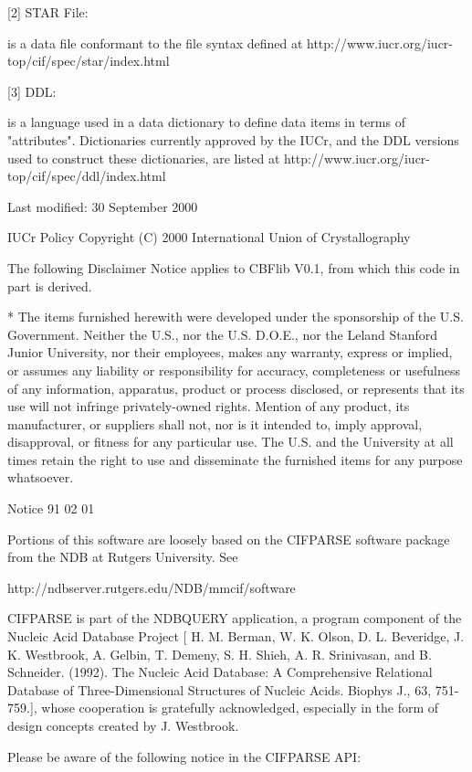 [2] STAR File:

is a data file conformant to the file syntax defined at
http://www.iucr.org/iucr-top/cif/spec/star/index.html

[3] DDL:

is a language used in a data dictionary to define data items in terms
of "attributes". Dictionaries currently approved by the IUCr, and the
DDL versions used to construct these dictionaries, are listed at
http://www.iucr.org/iucr-top/cif/spec/ddl/index.html

Last modified: 30 September 2000

IUCr Policy Copyright (C) 2000 International Union of Crystallography

The following Disclaimer Notice applies to CBFlib V0.1, from which this code
in part is derived.

* The items furnished herewith were developed under the sponsorship of the
U.S. Government. Neither the U.S., nor the U.S. D.O.E., nor the Leland
Stanford Junior University, nor their employees, makes any warranty,
express or implied, or assumes any liability or responsibility for
accuracy, completeness or usefulness of any information, apparatus, product
or process disclosed, or represents that its use will not infringe
privately-owned rights. Mention of any product, its manufacturer, or
suppliers shall not, nor is it intended to, imply approval, disapproval,
or fitness for any particular use. The U.S. and the University at all times
retain the right to use and disseminate the furnished items for any purpose
whatsoever.

Notice 91 02 01

Portions of this software are loosely based on the CIFPARSE software package
from the NDB at Rutgers University.  See

   http://ndbserver.rutgers.edu/NDB/mmcif/software

CIFPARSE is part of the NDBQUERY application, a program component of the
Nucleic Acid Database Project [ H. M. Berman, W. K. Olson, D. L. Beveridge,
J. K. Westbrook, A. Gelbin, T. Demeny, S. H. Shieh, A. R. Srinivasan, and B.
Schneider. (1992). The Nucleic Acid Database: A Comprehensive Relational
Database of Three-Dimensional Structures of Nucleic Acids. Biophys J., 63,
751-759.], whose cooperation is gratefully acknowledged, especially in the
form of design concepts created by J. Westbrook.

Please be aware of the following notice in the CIFPARSE API:

